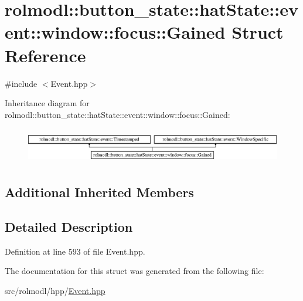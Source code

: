 \hypertarget{structrolmodl_1_1button__state_1_1hat_state_1_1event_1_1window_1_1focus_1_1_gained}{}\section{rolmodl\+::button\+\_\+state\+::hat\+State\+::event\+::window\+::focus\+::Gained Struct Reference}
\label{structrolmodl_1_1button__state_1_1hat_state_1_1event_1_1window_1_1focus_1_1_gained}


{\ttfamily \#include $<$Event.\+hpp$>$}

Inheritance diagram for rolmodl\+::button\+\_\+state\+::hat\+State\+::event\+::window\+::focus\+::Gained\+:\begin{figure}[H]
\begin{center}
\leavevmode
\includegraphics[height=1.586402cm]{structrolmodl_1_1button__state_1_1hat_state_1_1event_1_1window_1_1focus_1_1_gained}
\end{center}
\end{figure}
\subsection*{Additional Inherited Members}


\subsection{Detailed Description}


Definition at line 593 of file Event.\+hpp.



The documentation for this struct was generated from the following file\+:\begin{DoxyCompactItemize}
\item 
src/rolmodl/hpp/\mbox{\hyperlink{_event_8hpp}{Event.\+hpp}}\end{DoxyCompactItemize}
